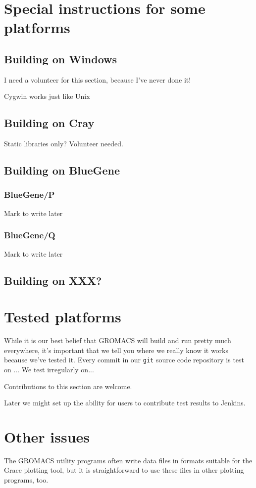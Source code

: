 \documentclass{article}[12pt,a4paper,twoside]
\newcommand{\gromacs}{GROMACS}
\newcommand{\grace}{Grace}
\begin{document}
\section{Special instructions for some platforms}

\subsection{Building on Windows}

I need a volunteer for this section, because I've never done it!

Cygwin works just like Unix

\subsection{Building on Cray}

Static libraries only? Volunteer needed.

\subsection{Building on BlueGene}

\subsubsection{BlueGene/P}

Mark to write later

\subsubsection{BlueGene/Q}

Mark to write later

\subsection{Building on XXX?}

\section{Tested platforms}

While it is our best belief that \gromacs{} will build and run pretty
much everywhere, it's important that we tell you where we really know
it works because we've tested it. Every commit in our \texttt{git}
source code repository is test on ... We test irregularly on...

Contributions to this section are welcome.

Later we might set up the ability for users to contribute test results
to Jenkins.

\section{Other issues}

The \gromacs{} utility programs often write data files in formats
suitable for the \grace{} plotting tool, but it is straightforward to
use these files in other plotting programs, too.
\end{document}
